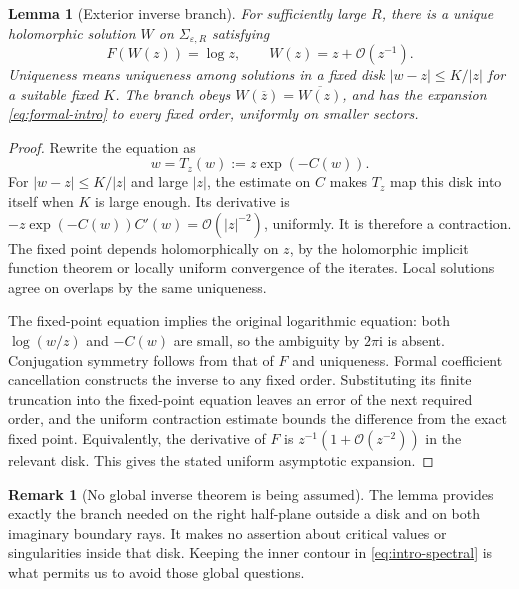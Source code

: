 \documentclass[11pt,a4paper]{article}
\newtheorem{lemma}[theorem]{Lemma}
\theoremstyle{definition}
\newtheorem{remark}[theorem]{Remark}
\numberwithin{equation}{section}
\newcommand{\ii}{\mathrm{i}}
\newcommand{\Oh}{\mathcal O}
\begin{document}
\begin{lemma}[Exterior inverse branch]
\label{lem:inverse}
For sufficiently large $R$, there is a unique holomorphic solution $W$ on $\Sigma_{\varepsilon,R}$ satisfying
\begin{equation}
 F(W(z))=\log z,\qquad W(z)=z+\Oh(z^{-1}).
 \label{eq:branch}
\end{equation}
Uniqueness means uniqueness among solutions in a fixed disk $|w-z|\le K/|z|$ for a suitable fixed $K$. The branch obeys
$W(\overline z)=\overline{W(z)}$, and has the expansion \eqref{eq:formal-intro} to every fixed order, uniformly on smaller sectors.
\end{lemma}
\begin{proof}
Rewrite the equation as
\[
 w=T_z(w):=z\exp(-C(w)).
\]
For $|w-z|\le K/|z|$ and large $|z|$, the estimate on $C$ makes $T_z$ map this disk into itself when $K$ is large enough. Its derivative is
$-z\exp(-C(w))C'(w)=\Oh(|z|^{-2})$, uniformly. It is therefore a contraction. The fixed point depends holomorphically on $z$, by the holomorphic implicit function theorem or locally uniform convergence of the iterates. Local solutions agree on overlaps by the same uniqueness.

The fixed-point equation implies the original logarithmic equation: both $\log(w/z)$ and $-C(w)$ are small, so the ambiguity by $2\pi\ii$ is absent. Conjugation symmetry follows from that of $F$ and uniqueness. Formal coefficient cancellation constructs the inverse to any fixed order. Substituting its finite truncation into the fixed-point equation leaves an error of the next required order, and the uniform contraction estimate bounds the difference from the exact fixed point. Equivalently, the derivative of $F$ is $z^{-1}(1+\Oh(z^{-2}))$ in the relevant disk. This gives the stated uniform asymptotic expansion.
\end{proof}

\begin{remark}[No global inverse theorem is being assumed]
The lemma provides exactly the branch needed on the right half-plane outside a disk and on both imaginary boundary rays. It makes no assertion about critical values or singularities inside that disk. Keeping the inner contour in \eqref{eq:intro-spectral} is what permits us to avoid those global questions.
\end{remark}
\end{document}

